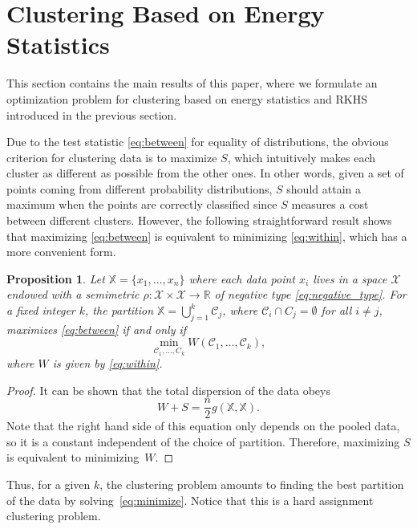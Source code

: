 \documentclass[aps,preprint,nofootinbib,floatfix]{revtex4-1}
\newtheorem{proposition}[theorem]{Proposition}
\newcommand\C{{\mathcal{C}}}
\begin{document}
\section{Clustering Based on Energy Statistics}
\label{sec:clustering_theory}

This section contains the main results of this paper, where 
we formulate an optimization problem for clustering 
based on energy statistics and RKHS introduced in the previous section.

Due to the test statistic \eqref{eq:between} for equality of distributions,
the obvious
criterion for clustering data is to 
maximize $S$, which intuitively makes 
each cluster as different
as possible from the other ones.
In other words, given a set of points coming from different probability
distributions, $S$ should attain a maximum when the points are correctly
classified since $S$ measures a cost between different clusters.
However, the following 
straightforward result
shows that maximizing \eqref{eq:between} is equivalent to minimizing
\eqref{eq:within}, which has a more convenient form.

\begin{proposition}
\label{th:minimize}
Let $\mathbb{X} = \{x_1,\dotsc,x_n\}$ where each data point
$x_i$ lives in a space $\mathcal{X}$ endowed with a semimetric $\rho:
\mathcal{X}\times\mathcal{X} \to \mathbb{R}$ of
negative type \eqref{eq:negative_type}. For a fixed integer $k$,
the partition
$\mathbb{X} = \bigcup_{j=1}^k \C_j$, where $\C_i \cap C_j = \emptyset$ for
all $i\ne j$, maximizes \eqref{eq:between} if and only if
\begin{equation}
\label{eq:minimize}
\min_{\C_1,\dotsc,C_k  } W(
\C_1, \dotsc, \C_k),
\end{equation}
where $W$ is given by \eqref{eq:within}.
\end{proposition}
\begin{proof}
It can be shown that the total dispersion of the data obeys \cite{Szkely2013}
\begin{equation}
W + S = \dfrac{n}{2} g(\mathbb{X}, \mathbb{X}). 
\end{equation}
Note that the right hand side of this equation 
only depends on the pooled data, so it is a constant
independent of the choice of partition. Therefore, maximizing
$S$ is equivalent to minimizing~$W$.
\end{proof}

Thus, for a given $k$, the clustering problem amounts to
finding the best partition of the data by solving~\eqref{eq:minimize}.
Notice that this is a hard assignment clustering problem.
\end{document}
